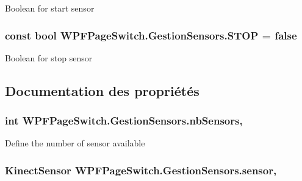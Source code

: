 Boolean for start sensor 

\hypertarget{class_w_p_f_page_switch_1_1_gestion_sensors_ac63f379c004d16664d15ebd2c0fe55d6}{
\subsubsection[{S\+T\+O\+P}]{\setlength{\rightskip}{0pt plus 5cm}const bool W\+P\+F\+Page\+Switch.\+Gestion\+Sensors.\+S\+T\+O\+P = false}}\label{class_w_p_f_page_switch_1_1_gestion_sensors_ac63f379c004d16664d15ebd2c0fe55d6}


Boolean for stop sensor 



\subsection{Documentation des propriétés}
\hypertarget{class_w_p_f_page_switch_1_1_gestion_sensors_a0ba7cfa18034bf823eb307e3fbb5222d}{
\subsubsection[{nb\+Sensors}]{\setlength{\rightskip}{0pt plus 5cm}int W\+P\+F\+Page\+Switch.\+Gestion\+Sensors.\+nb\+Sensors\hspace{0.3cm}{\ttfamily [get]}, {\ttfamily [set]}}}\label{class_w_p_f_page_switch_1_1_gestion_sensors_a0ba7cfa18034bf823eb307e3fbb5222d}


Define the number of sensor available 

\hypertarget{class_w_p_f_page_switch_1_1_gestion_sensors_acfdae1c543efbc38a3d4610e20985430}{
\subsubsection[{sensor}]{\setlength{\rightskip}{0pt plus 5cm}Kinect\+Sensor W\+P\+F\+Page\+Switch.\+Gestion\+Sensors.\+sensor\hspace{0.3cm}{\ttfamily [get]}, {\ttfamily [set]}}}\label{class_w_p_f_page_switch_1_1_gestion_sensors_acfdae1c543efbc38a3d4610e20985430}


